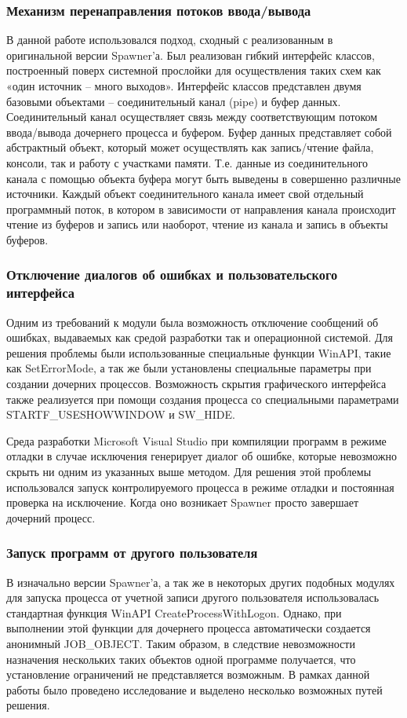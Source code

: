 \documentclass{imcs}
\begin{document}
\subsubsection{Механизм перенаправления потоков ввода/вывода}
В данной работе использовался подход, сходный с реализованным в оригинальной версии Spawner'а. Был реализован гибкий интерфейс классов, построенный поверх системной прослойки для осуществления таких схем как «один  источник – много выходов». Интерфейс классов представлен двумя базовыми объектами – соединительный канал (pipe) и буфер данных. Соединительный канал осуществляет связь между соответствующим потоком ввода/вывода дочернего процесса и буфером. Буфер данных представляет собой абстрактный объект, который может осуществлять как запись/чтение файла, консоли, так и работу с участками памяти. Т.е. данные из соединительного канала с помощью объекта буфера могут быть выведены в совершенно различные источники. Каждый объект соединительного канала имеет свой отдельный программный поток, в котором в зависимости от направления канала происходит чтение из буферов и запись или наоборот, чтение из канала и запись в объекты буферов.

\subsubsection{Отключение диалогов об ошибках и пользовательского интерфейса}
Одним из требований к модули была возможность отключение сообщений об ошибках, выдаваемых как средой разработки так и операционной системой. Для решения проблемы были использованные специальные функции WinAPI, такие как SetErrorMode, а так же были установлены специальные параметры при создании дочерних процессов.
Возможность скрытия графического интерфейса также реализуется при помощи создания процесса со специальными параметрами STARTF\_USESHOWWINDOW и SW\_HIDE.

Среда разработки Microsoft Visual Studio при компиляции программ в режиме отладки в случае исключения генерирует диалог об ошибке, которые невозможно скрыть ни одним из указанных выше методом. Для решения этой проблемы использовался запуск контролируемого процесса в режиме отладки и постоянная проверка на исключение. Когда оно возникает Spawner просто завершает дочерний процесс.

\subsubsection{Запуск программ от другого пользователя}
В изначально версии Spawner'а, а так же в некоторых других подобных модулях для запуска процесса от учетной записи другого пользователя использовалась стандартная функция WinAPI CreateProcessWithLogon. Однако, при выполнении этой функции для дочернего процесса автоматически создается анонимный JOB\_OBJECT. Таким образом, в следствие невозможности назначения нескольких таких объектов одной программе получается, что установление ограничений не представляется возможным. В рамках данной работы было проведено исследование и выделено несколько возможных путей решения.
\end{document}
